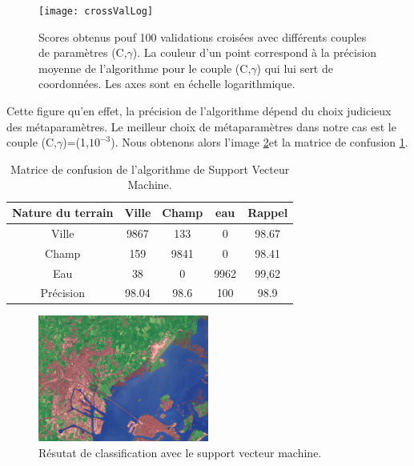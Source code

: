 \documentclass[a4paper,10pt]{article}
\begin{document}
\begin{figure}
  \centering
    \texttt{[image: crossValLog]}
  \caption{Scores obtenus pouf 100 validations croisées avec différents couples de paramètres (C,$\gamma$). La couleur d'un point correspond à la précision moyenne de l'algorithme pour le couple (C,$\gamma$) qui lui sert de coordonnées. Les axes sont en échelle logarithmique.}
  \label{fig:crossMap}
\end{figure}

Cette figure qu'en effet, la précision de l'algorithme dépend du choix judicieux des métaparamètres. Le meilleur choix de métaparamètres dans notre cas est le couple (C,$\gamma$)=(1,$ 10^{-3}$). Nous obtenons alors l'image \ref{fig:veniseSVM}et la matrice de confusion \ref{table:SVC}.

\begin{table}
\begin{center}
 \begin{tabular}{|c|c|c|c|c|}
  \hline
  Nature du terrain & Ville & Champ & eau & Rappel \\
  \hline
Ville & 9867 & 133 & 	0 &	98.67 \\
Champ & 159 &	9841 &	0 &	98.41 \\
Eau &  38 &	0 &	9962 &	99,62 \\
Précision & 98.04 & 98.6 & 100 & 98.9 \\
  \hline
  \end{tabular}
\end{center}
\label{table:SVC}
\caption{Matrice de confusion de l'algorithme de Support Vecteur Machine.}
\end{table}

\begin{figure}
  \centering
    \includegraphics[width=0.5\textwidth]{veniseSVM}
  \caption{Résutat de classification avec le support vecteur machine.}
  \label{fig:veniseSVM}
\end{figure}
\end{document}
